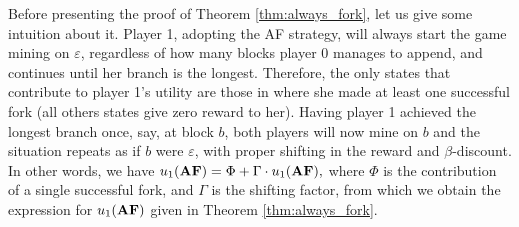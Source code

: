 Before presenting the proof of Theorem \ref{thm:always_fork}, let us give some intuition about it. Player 1, adopting the AF strategy, will always start the game mining on $\varepsilon$, regardless of how many blocks player 0 manages to append, and continues until her branch is the longest. Therefore, the only states that contribute to player 1's utility are those in where she made at least one successful fork (all others states give zero reward to her). Having player 1 achieved the longest branch once, say, at block $b$, both players will now mine on $b$ and the situation repeats as if $b$ were $\varepsilon$, with proper shifting in the reward and $\beta$-discount. In other words, we have
$u_1(\text{\rm {\bf AF}}) = \Phi + \Gamma\cdot u_1(\text{\rm {\bf AF}}),$
where $\Phi$ is the contribution of a single successful fork, and $\Gamma$ is the shifting factor, from which we obtain the expression for $u_1(\text{\rm {\bf AF}})$ given in Theorem \ref{thm:always_fork}.

